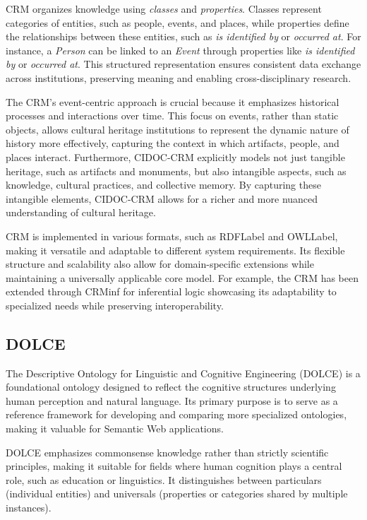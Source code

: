 CRM organizes knowledge using \textit{classes} and \textit{properties}. Classes represent categories of entities, such as people, events, and places, while properties define the relationships between these entities, such as \textit{is identified by} or \textit{occurred at}. For instance, a \textit{Person} can be linked to an \textit{Event} through properties like \textit{is identified by} or \textit{occurred at}. This structured representation ensures consistent data exchange across institutions, preserving meaning and enabling cross-disciplinary research.

The CRM's event-centric approach is crucial because it emphasizes historical processes and interactions over time. This focus on events, rather than static objects, allows cultural heritage institutions to represent the dynamic nature of history more effectively, capturing the context in which artifacts, people, and places interact. Furthermore, CIDOC-CRM explicitly models not just tangible heritage, such as artifacts and monuments, but also intangible aspects, such as knowledge, cultural practices, and collective memory. By capturing these intangible elements, CIDOC-CRM allows for a richer and more nuanced understanding of cultural heritage.

CRM is implemented in various formats, such as \acrshort{RDFLabel} and \acrshort{OWLLabel}, making it versatile and adaptable to different system requirements. Its flexible structure and scalability also allow for domain-specific extensions while maintaining a universally applicable core model. For example, the CRM has been extended through CRMinf\cite{CRMinf} for inferential logic showcasing its adaptability to specialized needs while preserving interoperability.

\subsection{DOLCE}\label{III-subsec:dolce}

The Descriptive Ontology for Linguistic and Cognitive Engineering (DOLCE) \cite{gangemiSweeteningOntologiesDOLCE2002a} is a foundational ontology designed to reflect the cognitive structures underlying human perception and natural language. Its primary purpose is to serve as a reference framework for developing and comparing more specialized ontologies, making it valuable for Semantic Web applications.

DOLCE emphasizes commonsense knowledge rather than strictly scientific principles, making it suitable for fields where human cognition plays a central role, such as education or linguistics. It distinguishes between particulars (individual entities) and universals (properties or categories shared by multiple instances).

